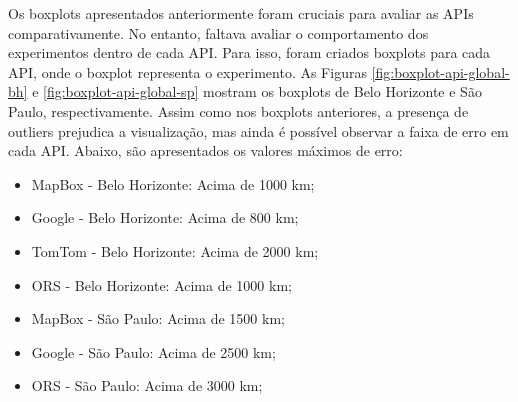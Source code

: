

Os boxplots apresentados anteriormente foram cruciais para avaliar as APIs comparativamente. No entanto, faltava avaliar o comportamento dos experimentos dentro de cada API. Para isso, foram criados boxplots para cada API, onde o boxplot representa o experimento. As Figuras \ref{fig:boxplot-api-global-bh} e \ref{fig:boxplot-api-global-sp} mostram os boxplots de Belo Horizonte e São Paulo, respectivamente. Assim como nos boxplots anteriores, a presença de outliers prejudica a visualização, mas ainda é possível observar a faixa de erro em cada API. Abaixo, são apresentados os valores máximos de erro:

\begin{itemize}
  \item MapBox - Belo Horizonte: Acima de 1000 km;
  \item Google - Belo Horizonte: Acima de 800 km;
  \item TomTom - Belo Horizonte: Acima de 2000 km;
  \item ORS - Belo Horizonte: Acima de 1000 km;
  \item MapBox - São Paulo: Acima de 1500 km;
  \item Google - São Paulo: Acima de 2500 km;
  \item ORS - São Paulo: Acima de 3000 km;
\end{itemize} 


